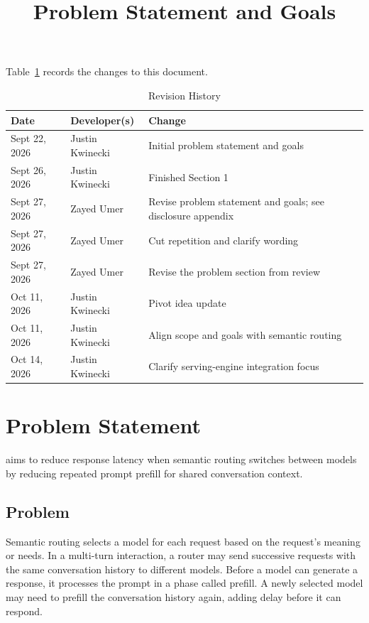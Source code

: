 \documentclass[11pt]{article}
\title{Problem Statement and Goals\\\progname}
\author{\authname}
\date{}
\begin{document}
\maketitle

Table~\ref{TblRevisionHistory} records the changes to this document.

\begin{table}[H]
\caption{Revision History} \label{TblRevisionHistory}
\begin{tabularx}{\textwidth}{llX}
\toprule
\textbf{Date} & \textbf{Developer(s)} & \textbf{Change}\\
\midrule
Sept 22, 2026 & Justin Kwinecki & Initial problem statement and goals\\
Sept 26, 2026 & Justin Kwinecki & Finished Section 1\\
Sept 27, 2026 & Zayed Umer & Revise problem statement and goals;
see disclosure appendix\\
Sept 27, 2026 & Zayed Umer & Cut repetition and clarify wording\\
Sept 27, 2026 & Zayed Umer & Revise the problem section from review\\
Oct 11, 2026 & Justin Kwinecki & Pivot idea update \\
Oct 11, 2026 & Justin Kwinecki & Align scope and goals with semantic routing \\
Oct 14, 2026 & Justin Kwinecki & Clarify serving-engine integration focus \\
\bottomrule
\end{tabularx}
\end{table}

\section{Problem Statement}

\progname{} aims to reduce response latency when semantic routing switches
between models by reducing repeated prompt prefill for shared conversation
context.

\subsection{Problem}

Semantic routing selects a model for each request based on the request's
meaning or needs. In a multi-turn interaction, a router may send successive
requests with the same conversation history to different models. Before a
model can generate a response, it processes the prompt in a phase called
prefill. A newly selected model may need to prefill the conversation history
again, adding delay before it can respond.
\end{document}
